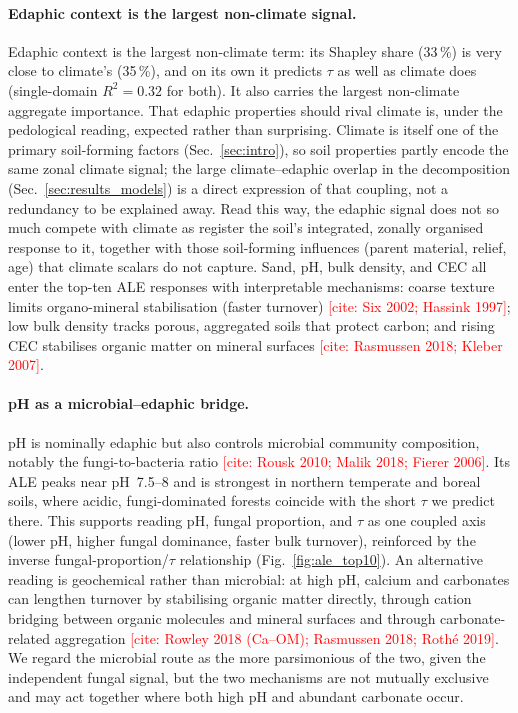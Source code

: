 \documentclass[12pt, a4paper]{article}
\newcommand{\PH}[1]{\textcolor{red}{#1}}
\begin{document}
\paragraph{Edaphic context is the largest non-climate signal.}
Edaphic context is the largest non-climate term: its Shapley share (33\,\%) is very
close to climate's (35\,\%), and on its own it predicts $\tau$ as well as climate
does (single-domain $R^2=0.32$ for both). It also carries the largest non-climate
aggregate importance. That edaphic properties should rival climate is, under the
pedological reading, expected rather than surprising. Climate is itself one of the
primary soil-forming factors (Sec.~\ref{sec:intro}), so soil properties partly
encode the same zonal climate signal; the large climate--edaphic overlap in the
decomposition (Sec.~\ref{sec:results_models}) is a direct expression of that
coupling, not a redundancy to be explained away. Read this way, the edaphic signal
does not so much compete with climate as register the soil's integrated, zonally
organised response to it, together with those soil-forming influences (parent
material, relief, age) that climate scalars do not capture. Sand, pH, bulk density, and CEC all enter the top-ten ALE responses with
interpretable mechanisms: coarse texture limits organo-mineral stabilisation (faster
turnover) \PH{[cite: Six 2002; Hassink 1997]}; low bulk density tracks porous,
aggregated soils that protect carbon; and rising CEC stabilises organic matter on
mineral surfaces \PH{[cite: Rasmussen 2018; Kleber 2007]}.

\paragraph{pH as a microbial--edaphic bridge.}
pH is nominally edaphic but also controls microbial community composition, notably
the fungi-to-bacteria ratio \PH{[cite: Rousk 2010; Malik 2018; Fierer 2006]}. Its
ALE peaks near pH~7.5--8 and is strongest in northern temperate and boreal soils,
where acidic, fungi-dominated forests coincide with the short $\tau$ we predict
there. This supports reading pH, fungal proportion, and $\tau$ as one coupled axis
(lower pH, higher fungal dominance, faster bulk turnover), reinforced by the
inverse fungal-proportion/$\tau$ relationship (Fig.~\ref{fig:ale_top10}). An
alternative reading is geochemical rather than microbial: at high pH, calcium and
carbonates can lengthen turnover by stabilising organic matter directly, through
cation bridging between organic molecules and mineral surfaces and through
carbonate-related aggregation \PH{[cite: Rowley 2018 (Ca--OM); Rasmussen 2018;
Roth\'e 2019]}. We regard the microbial route as the more parsimonious of the two,
given the independent fungal signal, but the two mechanisms are not mutually
exclusive and may act together where both high pH and abundant carbonate occur.
\end{document}
